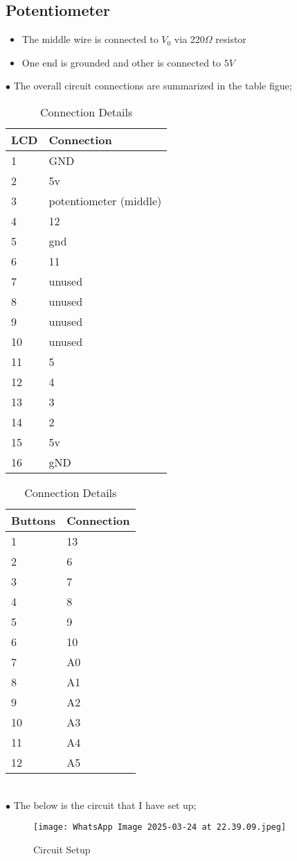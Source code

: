 \documentclass{article}
\begin{document}
\subsection{Potentiometer}
\begin{itemize}
    \item The middle wire is connected to $V_0$ via 220$\Omega$ resistor
    \item One end is grounded and other is connected to $5V$
\end{itemize}
$\bullet$ The overall circuit connections are summarized in the table figue; 
\begin{table}[h]
\centering
\caption{Connection Details}
\begin{tabular}{|l|l|}
\hline
\textbf{LCD} & \textbf{Connection} \\ \hline
1 & GND \\ \hline
2 & 5v \\ \hline
3 & potentiometer (middle) \\ \hline
4 & 12 \\ \hline
5 & gnd \\ \hline
6 & 11 \\ \hline
7 & unused \\ \hline
8 & unused \\ \hline
9 & unused \\ \hline
10 & unused \\ \hline
11 & 5 \\ \hline
12 & 4 \\ \hline
13 & 3 \\ \hline
14 & 2 \\ \hline
15 & 5v \\ \hline
16 & gND \\ \hline
\end{tabular}
\quad
\begin{tabular}{|l|l|}
\hline
\textbf{Buttons} & \textbf{Connection} \\ \hline
1 & 13 \\ \hline
2 & 6 \\ \hline
3 & 7 \\ \hline
4 & 8 \\ \hline
5 & 9 \\ \hline
6 & 10 \\ \hline
7 & A0 \\ \hline
8 & A1 \\ \hline
9 & A2 \\ \hline
10 & A3 \\ \hline
11 & A4 \\ \hline
12 & A5 \\ \hline
\end{tabular}
\end{table}\\
$\bullet$ The below is the circuit that I have set up;
\begin{figure}[H]
    \centering
    \texttt{[image: WhatsApp Image 2025-03-24 at 22.39.09.jpeg]} %
    \caption{Circuit Setup}
    \label{fig:example}
\end{figure}
\end{document}
